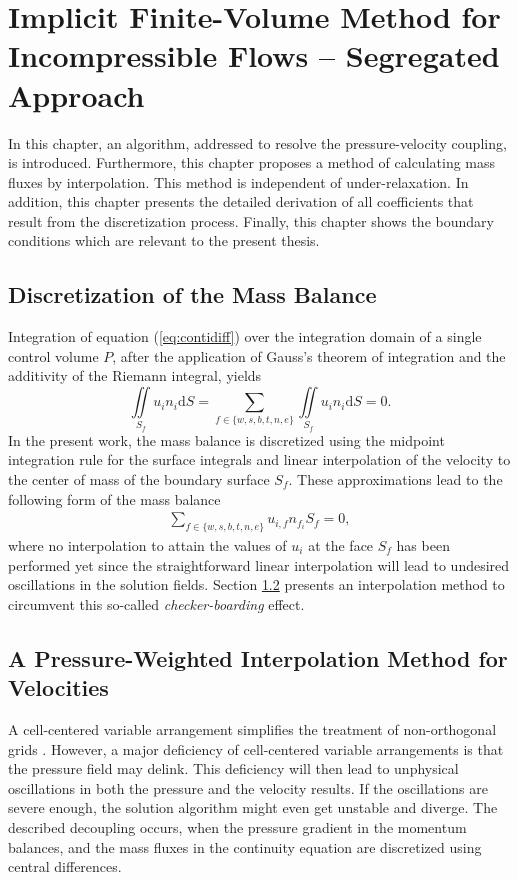 \chapter{Implicit Finite-Volume Method for Incompressible Flows -- Segregated Approach}
\label{sec:seg}
In this chapter, an algorithm, addressed to resolve the pressure-velocity coupling, is introduced. Furthermore, this chapter proposes a method of calculating mass fluxes by interpolation. This method is independent of under-relaxation. In addition, this chapter presents the detailed derivation of all coefficients that result from the discretization process. Finally, this chapter shows the boundary conditions which are relevant to the present thesis. 

\section{Discretization of the Mass Balance}

Integration of equation (\ref{eq:contidiff}) over the integration domain of a single control volume \(P\), after the application of Gauss's theorem of integration and the additivity of the Riemann integral, yields
\begin{displaymath}
  \iint\limits_{S_f} u_i n_i \mathrm{d}S = \sum_{f \in \{w,s,b,t,n,e\}} \iint\limits_{S_f} u_i n_{i} \mathrm{d}S = 0.
\end{displaymath}
In the present work, the mass balance is discretized using the midpoint integration rule for the surface integrals and linear interpolation of the velocity to the center of mass of the boundary surface \(S_f\). These approximations lead to the following form of the mass balance
\begin{align}
  \label{eq:massbalance}
  \sum_{f \in \{w,s,b,t,n,e\}} u_{i,f} n_{f_i} S_f = 0,
\end{align}
where no interpolation to attain the values of \(u_i\) at the face \(S_f\) has been performed yet since the straightforward linear interpolation will lead to undesired oscillations in the solution fields. Section \ref{sec:massflux} presents an interpolation method to circumvent this so-called \emph{checker-boarding} effect.

\section{A Pressure-Weighted Interpolation Method for Velocities}
\label{sec:massflux}

A cell-centered variable arrangement simplifies the treatment of non-orthogonal grids \cite{ferziger02,schaefer99}. However, a major deficiency of cell-centered variable arrangements is that the pressure field may delink. This deficiency will then lead to unphysical oscillations in both the pressure and the velocity results. If the oscillations are severe enough, the solution algorithm might even get unstable and diverge. The described decoupling occurs, when the pressure gradient in the momentum balances, and the mass fluxes in the continuity equation are discretized using central differences. 
  
